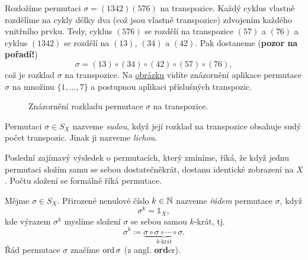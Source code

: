 \begin{example}
 Rozložíme permutaci $\sigma = (1342)(576)$ na transpozice. Každý cyklus vlastně
 rozdělíme na cykly délky dva (což jsou vlastně transpozice) zdvojením každého
 vnitřního prvku. Tedy, cyklus $(576)$ se rozdělí na transpozice $(57)$ a $(76)$
 a cyklus  $(1342)$ se rozdělí na $(13)$, $(34)$ a $(42)$. Pak dostaneme
 (\textbf{pozor na pořadí!})
 \[
  \sigma = (13) \circ (34) \circ (42) \circ (57) \circ (76),
 \]
 což je rozklad $\sigma$ na transpozice. Na
 \hyperref[fig:rozklad-na-transpozice]{obrázku} vidíte znázornění aplikace
 permutace $\sigma$ na množinu $\{1,\ldots,7\}$ a postupnou aplikaci příslušných
 transpozic.
 \begin{figure}[H]
  \centering
  \label{fig:rozklad-na-transpozice}
  \caption{Znázornění rozkladu permutace $\sigma$ na transpozice.}
 \end{figure}
\end{example}

\begin{definition}
\label{def:suda/licha-permutace}
 Permutaci $\sigma \in S_X$ nazveme \emph{sudou}, když její rozklad na
 transpozice obsahuje sudý počet transpozic. Jinak ji nazveme \emph{lichou}.
\end{definition}

Poslední zajímavý výsledek o permutacích, který zmíníme, říká, že když jednu
permutaci složím samu se sebou dostatečněkrát, dostanu identické zobrazení na
$X$. Počtu složení se formálně říká  permutace.

\begin{definition}
\label{def:rad-permutace}
 Mějme $\sigma \in S_X$. Přirozené nenulové číslo ${k \in \mathbb{N}}$ nazveme
 \emph{řádem} permutace $\sigma$, když
 \[
  \sigma^{k} = \mathds{1}_X,
 \]
 kde výrazem $\sigma^{k}$ myslíme složení $\sigma$ se sebou samou $k$-krát, tj.
 \[
  \sigma^{k} \coloneqq \underbrace{\sigma \circ \sigma \circ \cdots \circ
  \sigma.}_{k\text{-krát}}
 \]
 Řád permutace $\sigma$ značíme $\operatorname{ord} \sigma$ (z angl. \textbf{ord}er).
\end{definition}

